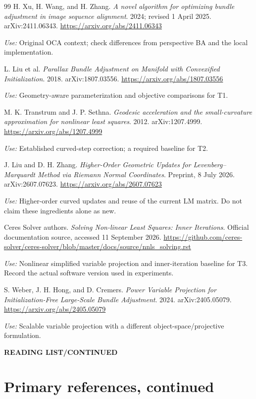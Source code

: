 \documentclass[11pt,a4paper]{article}
\newcommand{\kicker}[1]{{\sffamily\small\bfseries\color{accent}#1}\par}
\begin{document}
\begin{thebibliography}{99}
\setlength{\itemsep}{9pt}
H. Xu, H. Wang, and H. Zhang.
\emph{A novel algorithm for optimizing bundle adjustment in image sequence alignment}.
2024; revised 1 April 2025. arXiv:2411.06343.
\url{https://arxiv.org/abs/2411.06343}\par
\textit{Use:} Original OCA context; check differences from perspective BA and the local implementation.

L. Liu et al.
\emph{Parallax Bundle Adjustment on Manifold with Convexified Initialization}.
2018. arXiv:1807.03556.
\url{https://arxiv.org/abs/1807.03556}\par
\textit{Use:} Geometry-aware parameterization and objective comparisons for T1.

M. K. Transtrum and J. P. Sethna.
\emph{Geodesic acceleration and the small-curvature approximation for nonlinear least squares}.
2012. arXiv:1207.4999.
\url{https://arxiv.org/abs/1207.4999}\par
\textit{Use:} Established curved-step correction; a required baseline for T2.

J. Liu and D. H. Zhang.
\emph{Higher-Order Geometric Updates for Levenberg--Marquardt Method via Riemann Normal Coordinates}.
Preprint, 8 July 2026. arXiv:2607.07623.
\url{https://arxiv.org/abs/2607.07623}\par
\textit{Use:} Higher-order curved updates and reuse of the current LM matrix. Do not claim these ingredients alone as new.

Ceres Solver authors.
\emph{Solving Non-linear Least Squares: Inner Iterations}.
Official documentation source, accessed 11 September 2026.
\url{https://github.com/ceres-solver/ceres-solver/blob/master/docs/source/nnls_solving.rst}\par
\textit{Use:} Nonlinear simplified variable projection and inner-iteration baseline for T3. Record the actual software version used in experiments.

S. Weber, J. H. Hong, and D. Cremers.
\emph{Power Variable Projection for Initialization-Free Large-Scale Bundle Adjustment}.
2024. arXiv:2405.05079.
\url{https://arxiv.org/abs/2405.05079}\par
\textit{Use:} Scalable variable projection with a different object-space/projective formulation.

\clearpage
\kicker{READING LIST\quad /\quad CONTINUED}
\section*{Primary references, continued}


\end{thebibliography}
\end{document}
